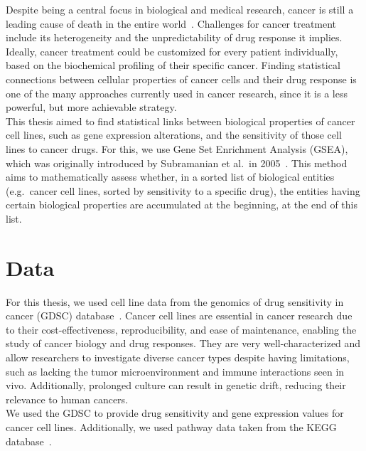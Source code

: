 Despite being a central focus in biological and medical research, cancer is still a leading cause of death in the entire world~\cite{owid-causes-of-death}. Challenges for cancer treatment include its heterogeneity and the unpredictability of drug response it implies. Ideally, cancer treatment could be customized for every patient individually, based on the biochemical profiling of their specific cancer. Finding statistical connections between cellular properties of cancer cells and their drug response is one of the many approaches currently used in cancer research, since it is a less powerful, but more achievable strategy.\\
This thesis aimed to find statistical links between biological properties of cancer cell lines, such as gene expression alterations, and the sensitivity of those cell lines to cancer drugs.
For this, we use Gene Set Enrichment Analysis (GSEA), which was originally introduced by Subramanian et al.\ in 2005~\cite{gsea_original}.
This method aims to mathematically assess whether, in a sorted list of biological entities (e.g.\ cancer cell lines, sorted by sensitivity to a specific drug), the entities having certain biological properties are accumulated at the beginning, at the end of this list.

\section{Data}\label{sec:data}
For this thesis, we used cell line data from the genomics of drug sensitivity in cancer (GDSC) database~\cite{gdsc,gdsc_paper}. Cancer cell lines are essential in cancer research due to their cost-effectiveness, reproducibility, and ease of maintenance, enabling the study of cancer biology and drug responses. They are very well-characterized and allow researchers to investigate diverse cancer types despite having limitations, such as lacking the tumor microenvironment and immune interactions seen in vivo. Additionally, prolonged culture can result in genetic drift, reducing their relevance to human cancers.\\
We used the GDSC to provide drug sensitivity and gene expression values for cancer cell lines.
Additionally, we used pathway data taken from the KEGG database~\cite{kegg_website,kegg_original_paper}.

